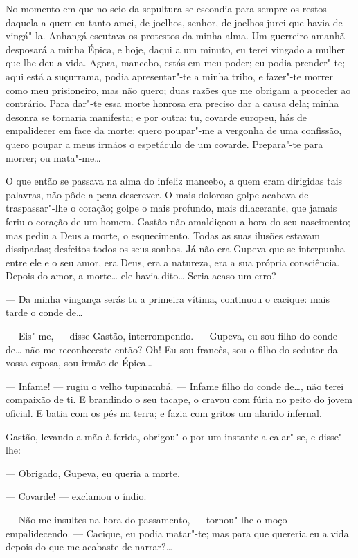 No momento em que no seio da sepultura se escondia para sempre os restos
daquela a quem eu tanto amei, de joelhos, senhor, de joelhos jurei que
havia de vingá"-la. Anhangá escutava os protestos da minha alma. Um
guerreiro amanhã desposará a minha Épica, e hoje, daqui a um minuto, eu
terei vingado a mulher que lhe deu a vida. Agora, mancebo, estás em meu
poder; eu podia prender"-te; aqui está a suçurrama, podia apresentar"-te a
minha tribo, e fazer"-te morrer como meu prisioneiro, mas não quero; duas
razões que me obrigam a proceder ao contrário. Para dar"-te essa morte
honrosa era preciso dar a causa dela; minha desonra se tornaria
manifesta; e por outra: tu, covarde europeu, hás de empalidecer em face
da morte: quero poupar"-me a vergonha de uma confissão, quero poupar a
meus irmãos o espetáculo de um covarde. Prepara"-te para morrer; ou
mata"-me\ldots{}

O que então se passava na alma do infeliz mancebo, a quem eram dirigidas
tais palavras, não pôde a pena descrever. O mais doloroso golpe acabava
de traspassar"-lhe o coração; golpe o mais profundo, mais dilacerante,
que jamais feriu o coração de um homem. Gastão não amaldiçoou a hora do
seu nascimento; mas pediu a Deus a morte, o esquecimento. Todas as suas
ilusões estavam dissipadas; desfeitos todos os seus sonhos. Já não era
Gupeva que se interpunha entre ele e o seu amor, era Deus, era a
natureza, era a sua própria consciência. Depois do amor, a morte\ldots{} ele
havia dito\ldots{} Seria acaso um erro?

--- Da minha vingança serás tu a primeira vítima, continuou o cacique:
mais tarde o conde de\ldots{}

--- Eis"-me, --- disse Gastão, interrompendo. --- Gupeva, eu sou filho do
conde de\ldots{} não me reconheceste então? Oh! Eu sou francês, sou o filho
do sedutor da vossa esposa, sou irmão de Épica\ldots{}

--- Infame! --- rugiu o velho tupinambá. --- Infame filho do conde de\ldots{},
não terei compaixão de ti. E brandindo o seu tacape, o cravou com fúria
no peito do jovem oficial. E batia com os pés na terra; e fazia com
gritos um alarido infernal.

Gastão, levando a mão à ferida, obrigou"-o por um instante a calar"-se, e
disse"-lhe:

--- Obrigado, Gupeva, eu queria a morte.

--- Covarde! --- exclamou o índio.

--- Não me insultes na hora do passamento, --- tornou"-lhe o moço
empalidecendo. --- Cacique, eu podia matar"-te; mas para que quereria eu
a vida depois do que me acabaste de narrar?\ldots{}

